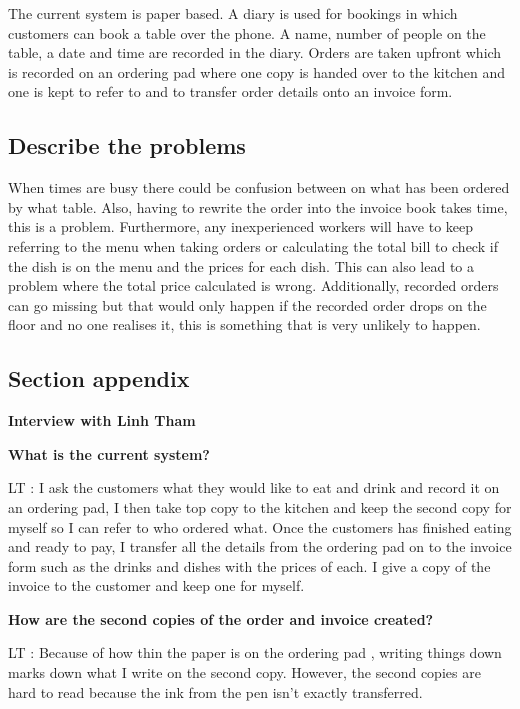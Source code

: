 The current system is  paper based. A diary is used for bookings in which customers can book a table over the phone. A name, number of people on the table, a date and time are recorded in the diary.  Orders are taken upfront which is recorded on an ordering pad where one copy is handed over to the kitchen and one is kept to refer to and to transfer order details onto an invoice form.

\subsection{Describe the problems}

When times are busy there could be confusion between on what has been ordered by what table. Also, having to rewrite the order into the invoice book takes time, this is a problem. Furthermore, any inexperienced workers will have to keep referring to the menu when taking orders or calculating the total bill to check if the dish is on the menu and the prices for each dish. This can also lead to a problem where the total price calculated is wrong. Additionally, recorded orders can go missing but that would only happen if the recorded order drops on the floor and no one realises it, this is something that is very unlikely to happen. 


\subsection{Section appendix}

\textbf{Interview with Linh Tham}

\textbf{What is the current system?}

LT : I ask the customers what they would like to eat and drink and record it on an ordering  pad, I then take top copy to the kitchen and keep the second copy for myself so I can refer to who ordered what. Once the customers has finished eating and ready to pay, I transfer all the details from the ordering pad on to the invoice form such as the drinks and dishes with the prices of each. I give a copy of the invoice to the customer and keep one for myself.

\textbf{How are the second copies of the order and invoice created?}

LT : Because of how thin the paper is on the ordering pad ,  writing things down marks down what I write on the second copy. However, the second copies are hard to read because the ink from the pen isn't exactly transferred.

